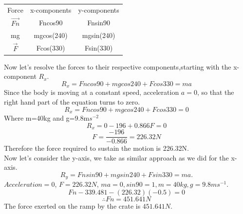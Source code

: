 \documentclass[10pt,a4paper]{article}
\begin{document}
\begin{table}[h!]
\centering
\begin{tabular}{c c c}
Force & x-components & y-components\\
$\overrightarrow{Fn}$& Fncos90 & Fnsin90\\
mg& mgcos(240)&mgsin(240)\\
$\overrightarrow{F}$ & Fcos(330)&Fsin(330)
\end{tabular}
\end{table}
Now let's resolve the forces to their respective components,starting with the x-component $R_{x}$.\\
$$R_{x}=Fncos90+mgcos240+Fcos330=ma$$
Since the body is moving at a constant speed, acceleration $a=0$, so that the right hand part of the equation turns to zero. 
$$R_{x}=Fncos90+mgcos240+Fcos330=0$$
Where m=40kg and g=9.8m$s^{-2}$
$$R_{x}=0-196+0.866F=0$$
$$F=\frac{-196}{-0.866}=226.32N$$
Therefore the force required to sustain the motion is 226.32N.\\
Now let's consider the y-axis, we take as similar approach as we did for the x-axis.
$$R_{y}=Fnsin90+mgsin240+Fsin330=ma.$$
$Acceleration=0$, $F=226.32N$, $ma=0, sin90=1,m=40kg,g=9.8ms^{-1}$.
$$ Fn-339.481-(226.32)(-0.5)=0$$
$$\therefore Fn=451.641N$$
The force exerted on the ramp by the crate is $451.641N$. 
\end{document}
